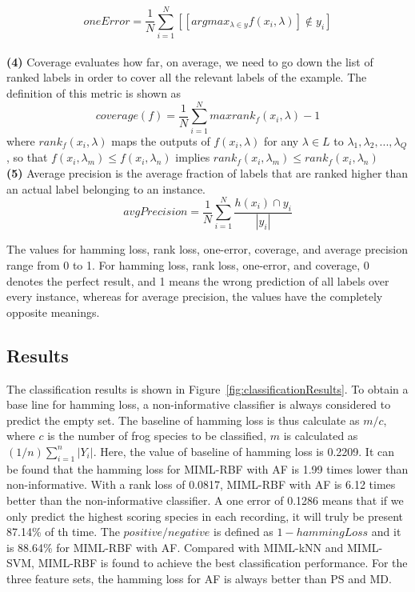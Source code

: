 \begin{equation}
oneError = \frac{1}{N}\sum_{i=1}^{N}[[argmax_{\lambda \in y} f(x_{i},\lambda)] \not \in y_{i} ]
\end{equation}
\\
\textbf{(4)} 
Coverage evaluates how far, on average, we need to go down
the list of ranked labels in order to cover all the relevant labels of the example. The definition of this metric is shown as
\begin{equation}
coverage(f)= \frac{1}{N}\sum_{i=1}^{N} max {rank_{f}(x_{i}, \lambda)-1}
\end{equation}
where $rank_{f}(x_{i}, \lambda)$ maps the outputs of $f(x_{i}, \lambda)$ for any
$\lambda \in L$ to ${\lambda_{1},\lambda_{2},...,\lambda_{Q}}$, so that 
$f(x_{i}, \lambda_{m}) \leq f(x_{i}, \lambda_{n})$ implies 
$rank_{f}(x_{i}, \lambda_{m}) \leq rank_{f}(x_{i}, \lambda_{n})$ 
\\
\textbf{(5)} 
Average precision is the average fraction of labels that are ranked higher than an actual label belonging to an instance. 
\begin{equation}
avgPrecision = \frac{1}{N}\sum_{i=1}^{N}\frac{h(x_{i}) \cap y_{i}}{|y_{i}|}
\end{equation}

The values for hamming loss, rank loss, one-error, coverage, and average precision range from 0 to 1. For hamming loss, rank loss, one-error, and coverage, 0 denotes the perfect result, and 1 means the wrong prediction of all labels over every instance, whereas for average precision, the values have the completely opposite meanings. 



\subsection{Results}

The classification results is shown in Figure~\ref{fig:classificationResults}. To obtain a base line for hamming loss, a non-informative classifier is always considered to predict the empty set. The baseline of hamming loss is thus calculate as $m/c$, where $c$ is the number of frog species to be classified, $m$ is calculated as $(1/n)\sum_{i=1}^{n}|Y_{i}|$. Here, the value of baseline of hamming loss is 0.2209. It can be found that the hamming loss for MIML-RBF with AF is 1.99 times lower than non-informative. With a rank loss of 0.0817, MIML-RBF with AF is 6.12 times better than the non-informative classifier. A one error of 0.1286 means that if we only predict the highest scoring species in each recording, it will truly be present 87.14\% of th time. 
The $positive/negative$ is defined as $1-hammingLoss$ and it is 88.64\% for MIML-RBF with AF. Compared with MIML-kNN and MIML-SVM,  MIML-RBF is found to achieve the best classification performance. For the three feature sets,  the hamming loss for AF is always better than PS and MD. 



